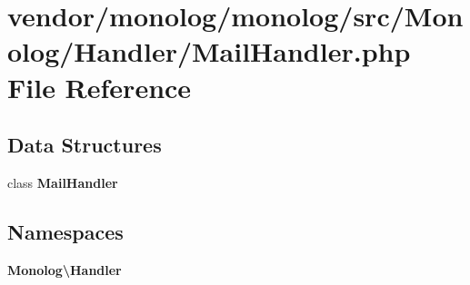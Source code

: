 \section{vendor/monolog/monolog/src/\+Monolog/\+Handler/\+Mail\+Handler.php File Reference}
\label{_mail_handler_8php}
\subsection*{Data Structures}
\begin{DoxyCompactItemize}
\item 
class {\bf Mail\+Handler}
\end{DoxyCompactItemize}
\subsection*{Namespaces}
\begin{DoxyCompactItemize}
\item 
 {\bf Monolog\textbackslash{}\+Handler}
\end{DoxyCompactItemize}
